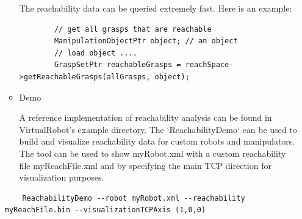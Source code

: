 \documentclass{book}
\begin{document}
\begin{itemize}
\begin{itemize}
   The reachability data can be queried extremely fast. Here is an example: 
    \begin{lstlisting}
        // get all grasps that are reachable
        ManipulationObjectPtr object; // an object
        // load object ....
        GraspSetPtr reachableGrasps = reachSpace->getReachableGrasps(allGrasps, object); 
    \end{lstlisting}
     \item Demo  \par
     A reference implementation of reachability analysis can be found in VirtualRobot's example directory. The `ReachabilityDemo` can be used to build and visualize reachability data for custom robots and manipulators. The tool can be used to show myRobot.xml with a custom reachability file myReachFile.xml and by specifying the main TCP direction for visualization purposes. 
     \end{itemize} 
     \begin{lstlisting}
    ReachabilityDemo --robot myRobot.xml --reachability myReachFile.bin --visualizationTCPAxis (1,0,0) 
        \end{lstlisting} 
 

\end{itemize}
\end{document}
